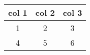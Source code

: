 \documentclass{article}
\begin{document}
\begin{table}[h]
\begin{tabular}{|c|c|c|}
\toprule
\textbf{col 1} & \textbf{col 2} & \textbf{col 3} \\
\midrule
1 & 2 & 3 \\
4 & 5 & 6 \\
\bottomrule
\end{tabular}
\end{table}
\end{document}
